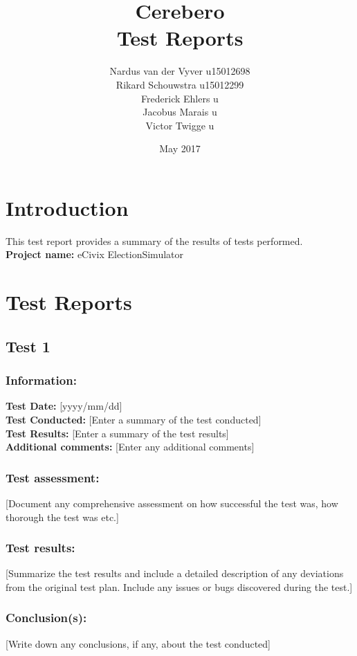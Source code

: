 \documentclass{article}
\title{Cerebero\\Test Reports}
\date{May 2017}
\author{Nardus van der Vyver u15012698 \\
          Rikard Schouwstra u15012299 \\
          Frederick Ehlers u \\
          Jacobus Marais u \\
          Victor Twigge u \\}
\newcommand\tab[1][1cm]{\hspace*{#1}}
\begin{document}
  \maketitle

  \tableofcontents

  \section{Introduction}
      This test report provides a summary of the results of tests performed.\\
      \textbf{Project name:} eCivix ElectionSimulator

  \section{Test Reports}
      \subsection{Test 1}
          \subsubsection{Information:}
              \tab \textbf{Test Date:} [yyyy/mm/dd]\\
              \tab \textbf{Test Conducted:} [Enter a summary of the test conducted]\\
              \tab \textbf{Test Results:} [Enter a summary of the test results]\\
              \tab \textbf{Additional comments:} [Enter any additional comments]\\

          \subsubsection{Test assessment:}
              [Document any comprehensive assessment on how successful the test was, how thorough the test was etc.]

          \subsubsection{Test results:}
              [Summarize the test results and include a detailed description of any deviations from the original test plan. Include any issues or bugs discovered during the test.]

          \subsubsection{Conclusion(s):}
              [Write down any conclusions, if any, about the test conducted]
\end{document}
